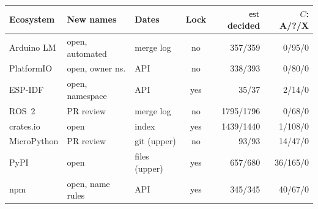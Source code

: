 \begin{tabular}{@{}lllcrr@{}}
\toprule
Ecosystem & New names & Dates & Lock & $\mathsf{est}$ decided & $C$: A/?/X \\
\midrule
Arduino LM & open, automated & merge log & no & 357/359 & 0/95/0 \\
PlatformIO & open, owner ns. & API & no & 338/393 & 0/80/0 \\
ESP-IDF & open, namespace & API & yes & 35/37 & 2/14/0 \\
ROS~2 & PR review & merge log & no & 1795/1796 & 0/68/0 \\
crates.io & open & index & yes & 1439/1440 & 1/108/0 \\
MicroPython & PR review & git (upper) & no & 93/93 & 14/47/0 \\
PyPI & open & files (upper) & yes & 657/680 & 36/165/0 \\
npm & open, name rules & API & yes & 345/345 & 40/67/0 \\
\bottomrule
\end{tabular}

